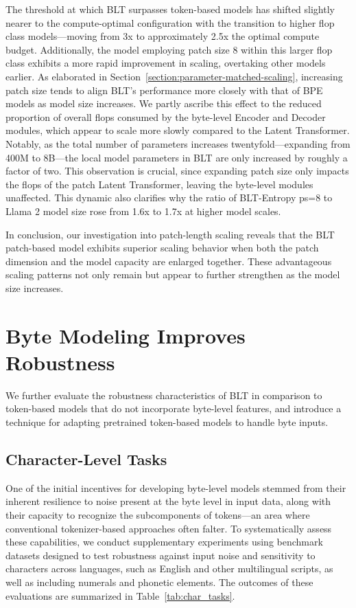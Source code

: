 The threshold at which {\textsc BLT} surpasses token-based models has shifted slightly nearer to the compute-optimal configuration with the transition to higher flop class models—moving from 3x to approximately 2.5x the optimal compute budget. Additionally, the model employing patch size 8 within this larger flop class exhibits a more rapid improvement in scaling, overtaking other models earlier. As elaborated in Section~\ref{section:parameter-matched-scaling}, increasing patch size tends to align {\textsc BLT}'s performance more closely with that of BPE models as model size increases. We partly ascribe this effect to the reduced proportion of overall flops consumed by the byte-level Encoder and Decoder modules, which appear to scale more slowly compared to the Latent Transformer. Notably, as the total number of parameters increases twentyfold—expanding from 400M to 8B—the local model parameters in {\textsc BLT} are only increased by roughly a factor of two. This observation is crucial, since expanding patch size only impacts the flops of the patch Latent Transformer, leaving the byte-level modules unaffected. This dynamic also clarifies why the ratio of {\textsc BLT}-Entropy ps=8 to Llama 2 model size rose from 1.6x to 1.7x at higher model scales.

In conclusion, our investigation into patch-length scaling reveals that the {\textsc BLT} patch-based model exhibits superior scaling behavior when both the patch dimension and the model capacity are enlarged together. These advantageous scaling patterns not only remain but appear to further strengthen as the model size increases.

\section{Byte Modeling Improves Robustness} We further evaluate the robustness characteristics of {\textsc BLT} in comparison to token-based models that do not incorporate byte-level features, and introduce a technique for adapting pretrained token-based models to handle byte inputs.
\label{sec:robustness}

\subsection{Character-Level Tasks}

One of the initial incentives for developing byte-level models stemmed from their inherent resilience to noise present at the byte level in input data, along with their capacity to recognize the subcomponents of tokens—an area where conventional tokenizer-based approaches often falter. To systematically assess these capabilities, we conduct supplementary experiments using benchmark datasets designed to test robustness against input noise and sensitivity to characters across languages, such as English and other multilingual scripts, as well as including numerals and phonetic elements. The outcomes of these evaluations are summarized in Table~\ref{tab:char_tasks}.

